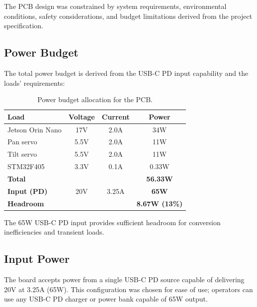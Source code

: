 \documentclass[12pt, titlepage]{article}
\begin{document}
The PCB design was constrained by system requirements, environmental
conditions, safety considerations, and budget limitations derived from the
project specification.

\subsection{Power Budget}

The total power budget is derived from the USB-C PD input capability and the
loads' requirements:

\begin{table}[h]
  \centering
  \caption{Power budget allocation for the \progname{} PCB.}
  \label{tab:power-budget}
  \begin{tabular}{@{}lccc@{}}
    \toprule
    \textbf{Load}       & \textbf{Voltage} & \textbf{Current} & \textbf{Power}        \\
    \midrule
    Jetson Orin Nano    & 17V              & 2.0A             & 34W                   \\
    Pan servo           & 5.5V             & 2.0A             & 11W                   \\
    Tilt servo          & 5.5V             & 2.0A             & 11W                   \\
    STM32F405           & 3.3V             & 0.1A             & 0.33W                 \\
    \midrule
    \textbf{Total}      &                  &                  & \textbf{56.33W}       \\
    \textbf{Input (PD)} & 20V              & 3.25A            & \textbf{65W}          \\
    \textbf{Headroom}   &                  &                  & \textbf{8.67W (13\%)} \\
    \bottomrule
  \end{tabular}
\end{table}

The 65W USB-C PD input provides sufficient headroom for conversion
inefficiencies and transient loads.

\subsection{Input Power}

The board accepts power from a single USB-C PD source capable of delivering 20V
at 3.25A (65W). This configuration was chosen for ease of use; operators can
use any USB-C PD charger or power bank capable of 65W output.
\end{document}
